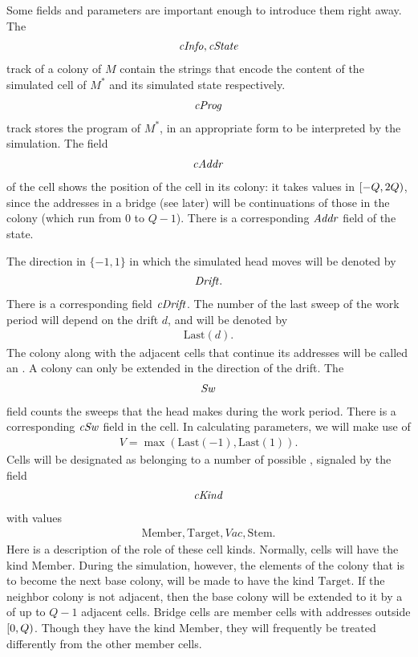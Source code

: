 \documentclass[12pt]{memoir}
\newcommand{\fld}[1]{\ensuremath{\textit{#1\/}}}
\newcommand{\Vacant}{\mathit{Vac}}
\renewcommand{\V}{V}
\newcommand{\Addr}{\fld{Addr}}
\newcommand{\cAddr}{\fld{cAddr}}
\newcommand{\Drift}{\fld{Drift}}
\newcommand{\cDrift}{\fld{cDrift}}
\newcommand{\cInfo}{\fld{cInfo}}
\newcommand{\cKind}{\fld{cKind}}
\newcommand{\cProg}{\fld{cProg}}
\newcommand{\cState}{\fld{cState}}
\newcommand{\Sweep}{\fld{Sw}}
\newcommand{\cSweep}{\fld{cSw}}
\newcommand{\Last}{\mathrm{Last}}
\newcommand{\Member}{\mathrm{Member}}
\newcommand{\Target}{\mathrm{Target}}
\newcommand{\Stem}{\mathrm{Stem}}
\begin{document}
Some fields and parameters are important enough to introduce them right away.
The 
\begin{align*}
   \cInfo,\cState
 \end{align*}
track of a colony of \( M \)
contain the strings that encode the content of the simulated cell of \( M^{*} \) and
its simulated state respectively.
\begin{align*}
 \cProg
 \end{align*}
track stores the program of \( M^{*} \), in an appropriate form 
to be interpreted by the simulation.
The field 
 \begin{align*}
  \cAddr
 \end{align*}
of the cell shows the position of the cell in its colony:
it takes values in \( \left[-Q,2Q\right) \), since the addresses in a bridge (see later)
will be continuations of those in the colony (which run from \( 0 \) to \( Q-1 \)).
There is a corresponding \( \Addr \) field of the state.

The direction in \( \{-1,1\} \) in which the simulated head moves will be denoted by
 \begin{align*}
   \Drift.
 \end{align*}
There is a corresponding field \( \cDrift \).
The number of the last sweep of the work period will depend on the drift \( d \), 
and will be denoted by 
\begin{align}\label{eq:Last}
   \Last(d).
 \end{align}
The colony along with the adjacent cells that continue its addresses will be called
an .
A colony can only be extended in the direction of the drift.
The
 \begin{align*}
 \Sweep
 \end{align*}
field counts the sweeps that the head makes during the work period.
There is a corresponding \( \cSweep \) field in the cell.
In calculating parameters, we will make use of  
\begin{align}\label{eq:V}
   \V=\max(\Last(-1),\Last(1)).
 \end{align}
Cells will be designated as belonging to a number of possible , signaled by the
field 
\begin{align*}
     \cKind
 \end{align*}
with values
       \begin{align*}
          \Member, \Target, \Vacant, \Stem.
       \end{align*}
Here is a description of the role of these cell kinds.
Normally, cells will have the kind \( \Member \).
During the simulation, however, the elements of the colony that is to become
the next base colony, will be made to have the kind \( \Target \).
If the neighbor colony 
is not adjacent, then the base colony will be extended to it by 
a  of up to \( Q-1 \) adjacent cells.
Bridge cells are member cells with addresses outside \( \left[0,Q\right) \).
Though they have the kind \( \Member \), they will frequently be treated
differently from the other member cells.
\end{document}
